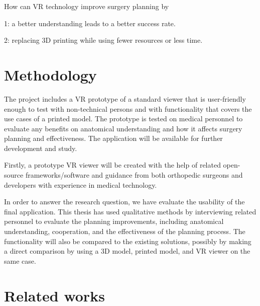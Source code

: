 \documentclass[a4paper]{report}
\begin{document}
How can VR technology improve surgery planning by

1: a better understanding leads to a better success rate.

2: replacing 3D printing while using fewer resources or less time.

\section{Methodology}

The project includes a VR prototype of a standard viewer that is user-friendly enough to test with non-technical persons and with functionality that covers the use cases of a printed model.
The prototype is tested on medical personnel to evaluate any benefits on anatomical understanding and how it affects surgery planning and effectiveness. The application will be available for further development and study.

Firstly, a prototype VR viewer will be created with the help of related open-source frameworks/software and guidance from both orthopedic surgeons and developers with experience in medical technology.

In order to answer the research question, we have evaluate the usability of the final application. This thesis has used qualitative methods
by interviewing related personnel to evaluate the planning improvements, including anatomical understanding, cooperation, and the effectiveness of the planning process.
The functionality will also be compared to the existing solutions, possibly by making a direct comparison by using a 3D model, printed model, and VR viewer
on the same case.

\section{Related works}
\end{document}
